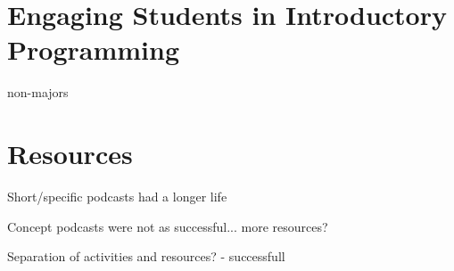 
\section{Engaging Students in Introductory Programming} %
\label{sec:engaging_students_in_introductory_programming}


\citet{Guzdial:2005} non-majors


\section{Resources} %
\label{sec:resources}

Short/specific podcasts had a longer life

Concept podcasts were not as successful... more resources?

Separation of activities and resources? - successfull






